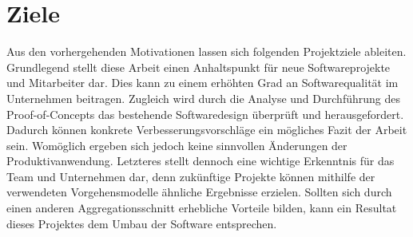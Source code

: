 \section{Ziele}

Aus den vorhergehenden Motivationen lassen sich folgenden Projektziele ableiten. Grundlegend stellt diese Arbeit einen Anhaltspunkt für neue Softwareprojekte und Mitarbeiter dar. Dies kann zu einem erhöhten Grad an Softwarequalität im Unternehmen beitragen. Zugleich wird durch die Analyse und Durchführung des Proof-of-Concepts das bestehende Softwaredesign überprüft und herausgefordert. Dadurch können konkrete Verbesserungsvorschläge ein mögliches Fazit der Arbeit sein. Womöglich ergeben sich jedoch keine sinnvollen Änderungen der Produktivanwendung. Letzteres stellt dennoch eine wichtige Erkenntnis für das Team und Unternehmen dar, denn zukünftige Projekte können mithilfe der verwendeten Vorgehensmodelle ähnliche Ergebnisse erzielen. Sollten sich durch einen anderen Aggregationsschnitt erhebliche Vorteile bilden, kann ein Resultat dieses Projektes dem Umbau der Software entsprechen.
